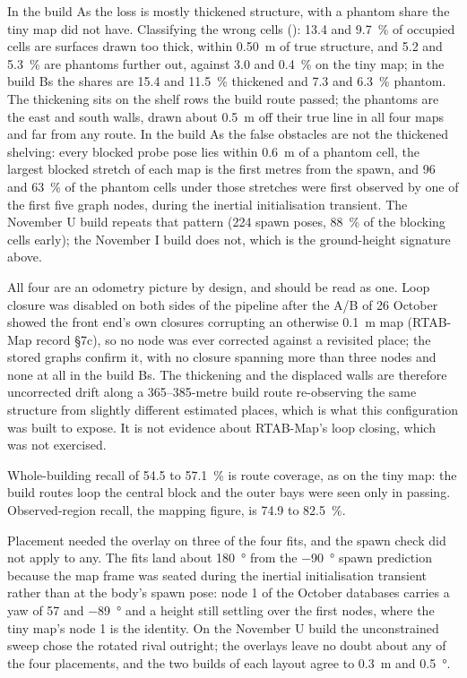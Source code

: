 \documentclass[11pt,a4paper,notitlepage]{report}
\begin{document}
In the build As the loss is mostly thickened structure, with a phantom
share the tiny map did not have. Classifying the wrong cells
(): 13.4 and \SI{9.7}{\percent} of occupied
cells are surfaces drawn too thick, within \SI{0.50}{\metre} of true
structure, and 5.2 and \SI{5.3}{\percent} are phantoms further out, against
3.0 and \SI{0.4}{\percent} on the tiny map; in the build Bs the shares
are 15.4 and \SI{11.5}{\percent} thickened and 7.3 and \SI{6.3}{\percent}
phantom. The thickening sits on the shelf rows the build route passed; the
phantoms are the east and south walls, drawn about \SI{0.5}{\metre} off their
true line in all four maps and far from any route. In the build As the
false obstacles are not the thickened shelving: every blocked probe pose lies
within \SI{0.6}{\metre} of a phantom cell, the largest blocked stretch of each
map is the first metres from the spawn, and 96 and \SI{63}{\percent} of the
phantom cells under those stretches were first observed by one of the first
five graph nodes, during the inertial initialisation transient. The November U
build repeats that pattern (224 spawn poses, \SI{88}{\percent} of the blocking
cells early); the November I build does not, which is the ground-height
signature above.

All four are an odometry picture by design, and should be read as one. Loop
closure was disabled on both sides of the pipeline after the A/B of 26 October
showed the front end's own closures corrupting an otherwise \SI{0.1}{\metre}
map (RTAB-Map record \S7c), so no node was ever corrected against a revisited
place; the stored graphs confirm it, with no closure spanning more than three
nodes and none at all in the build Bs. The thickening and the displaced
walls are therefore uncorrected drift along a 365--385-metre build route
re-observing the same structure from slightly different estimated places,
which is what this configuration was built to expose. It is not evidence
about RTAB-Map's loop closing, which was not exercised.

Whole-building recall of 54.5 to \SI{57.1}{\percent} is route coverage, as on
the tiny map: the build routes loop the central block and the outer bays were
seen only in passing. Observed-region recall, the mapping figure, is 74.9 to
\SI{82.5}{\percent}.

Placement needed the overlay on three of the four fits, and the spawn check
did not apply to any. The fits land about \SI{180}{\degree} from the
\SI{-90}{\degree} spawn prediction because the map frame was seated during the
inertial initialisation transient rather than at the body's spawn pose: node 1
of the October databases carries a yaw of \SI{57}{} and \SI{-89}{\degree} and a
height still settling over the first nodes, where the tiny map's node 1 is the
identity. On the November U build the unconstrained sweep chose the rotated
rival outright; the overlays leave no doubt about any of the four placements,
and the two builds of each layout agree to \SI{0.3}{\metre} and
\SI{0.5}{\degree}.
\end{document}
